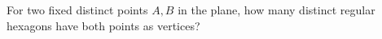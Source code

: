 For two fixed distinct points $A,B$ in the plane, how many distinct regular hexagons have both points as vertices?
